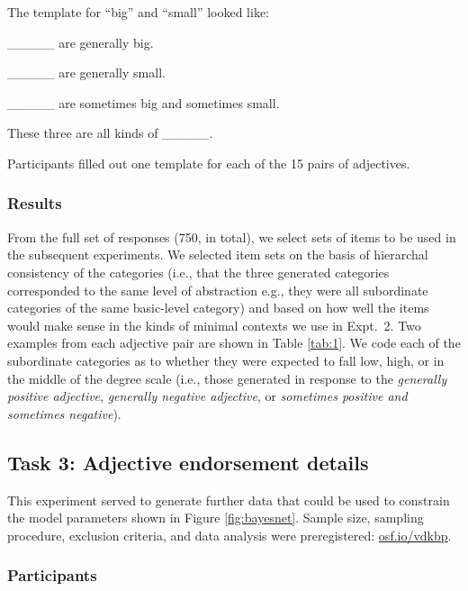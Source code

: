 \documentclass[doc]{apa6}
\begin{document}
The template for ``big'' and ``small'' looked like:
\begin{description}[noitemsep]
\item \_\_\_\_\_ are generally big.
\item  \_\_\_\_\_ are generally small.
\item \_\_\_\_\_ are sometimes big and sometimes small.
\item These three are all kinds of \_\_\_\_\_.
\end{description}
%
Participants filled out one template for each of the 15 pairs of adjectives.


\subsubsection{Results}
From the full set of responses (750, in total), we select sets of items to be used in the subsequent experiments.
We selected item sets on the basis of hierarchal consistency of the categories (i.e., that the three generated categories corresponded to the same level of abstraction e.g., they were all subordinate categories of the same basic-level category) and based on how well the items would make sense in the kinds of minimal contexts we use in Expt.~2.
Two examples from each adjective pair are shown in Table \ref{tab:1}.
We code each of the subordinate categories as to whether they were expected to fall low, high, or in the middle of the degree scale (i.e., those generated in response to the \emph{generally positive adjective}, \emph{generally negative adjective}, or \emph{sometimes positive and sometimes negative}).


\subsection{Task 3: Adjective endorsement details}

This experiment served to generate further data that could be used to constrain the model parameters shown in Figure \ref{fig:bayesnet}.
Sample size, sampling procedure, exclusion criteria, and data analysis were preregistered: \url{osf.io/vdkbp}.

\subsubsection{Participants}
\end{document}
